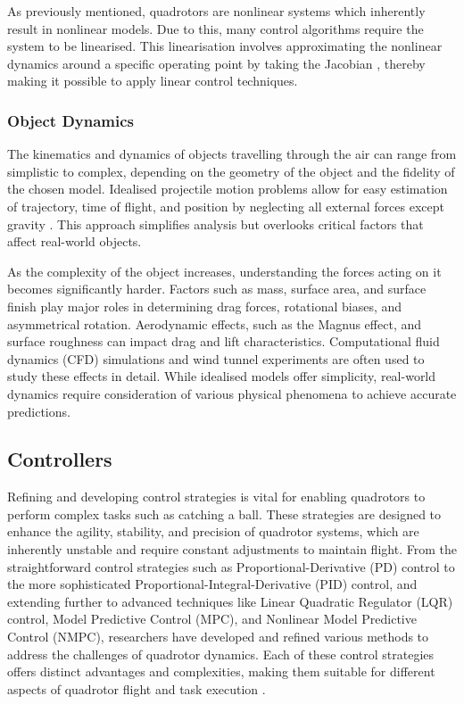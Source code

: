 \documentclass{UoNMCHA}
\numberwithin{equation}{section}
\begin{document}
As previously mentioned, quadrotors are nonlinear systems which inherently result in nonlinear models. Due to this, many control algorithms require the system to be linearised. This linearisation involves approximating the nonlinear dynamics around a specific operating point by taking the Jacobian {\cite{website:LinearisationandJacobian}}, thereby making it possible to apply linear control techniques. 

\subsubsection{Object Dynamics}
The kinematics and dynamics of objects travelling through the air can range from simplistic to complex, depending on the geometry of the object and the fidelity of the chosen model. Idealised projectile motion problems allow for easy estimation of trajectory, time of flight, and position by neglecting all external forces except gravity {\cite{website:ProjectilMotion}}. This approach simplifies analysis but overlooks critical factors that affect real-world objects.

As the complexity of the object increases, understanding the forces acting on it becomes significantly harder. Factors such as mass, surface area, and surface finish play major roles in determining drag forces, rotational biases, and asymmetrical rotation. Aerodynamic effects, such as the Magnus effect, and surface roughness can impact drag and lift characteristics. Computational fluid dynamics (CFD) simulations and wind tunnel experiments are often used to study these effects in detail. While idealised models offer simplicity, real-world dynamics require consideration of various physical phenomena to achieve accurate predictions.


\subsection{Controllers}
Refining and developing control strategies is vital for enabling quadrotors to perform complex tasks such as catching a ball. These strategies are designed to enhance the agility, stability, and precision of quadrotor systems, which are inherently unstable and require constant adjustments to maintain flight. From the straightforward control strategies such as Proportional-Derivative (PD) control to the more sophisticated Proportional-Integral-Derivative (PID) control, and extending further to advanced techniques like Linear Quadratic Regulator (LQR) control, Model Predictive Control (MPC), and Nonlinear Model Predictive Control (NMPC), researchers have developed and refined various methods to address the challenges of quadrotor dynamics. Each of these control strategies offers distinct advantages and complexities, making them suitable for different aspects of quadrotor flight and task execution \cite{ControllersCompare}.
\end{document}
